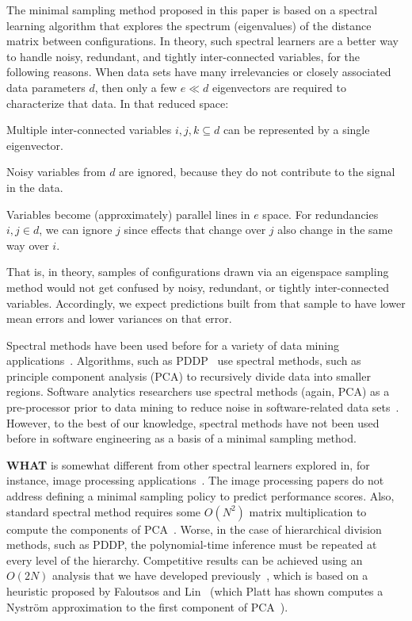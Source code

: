 \documentclass{sig-alternative}
\newcommand{\what}{{\bf WHAT }}
\begin{document}
The minimal sampling method proposed in this paper is based on a spectral learning algorithm
that  explores the spectrum (eigenvalues) of the distance matrix between  configurations.
In theory, such spectral learners are a better way to handle noisy, redundant, and tightly inter-connected variables, for the following reasons.
When data sets have many irrelevancies or closely associated data parameters $d$, then
only a few $e \ll d$ eigenvectors are required to characterize that data.
In that reduced space:
\begin{compactitem}
\item
Multiple inter-connected variables $i,j,k \subseteq d$ can be represented
by a single eigenvector.
\item
Noisy variables from $d$ are
ignored, because they  do not contribute to the signal in the data.
\item
Variables  become (approximately) parallel lines
in $e$ space. For  redundancies \mbox{$i,j \in d$}, we
can ignore $j$
since effects that change over $j$ also
change in the same way over $i$.
\end{compactitem}
That is, in theory, samples of configurations drawn via an eigenspace sampling method
would not get confused by noisy, redundant, or tightly inter-connected variables. Accordingly,
we expect predictions built from that sample to have  lower mean errors and lower variances on that error.

Spectral methods have been used before for a variety of data mining applications~\cite{kamvar2003spectral}.
Algorithms, such as PDDP~\cite{boley98} use spectral methods, such as principle component analysis (PCA) to
recursively divide data into smaller regions.  Software analytics researchers use spectral methods (again, PCA) as a pre-processor prior to data mining  to reduce noise in software-related data sets~\cite{Theisen15}.
However, to the best of our knowledge, spectral methods have not been used before in software engineering as a basis of a minimal sampling method.


\what is somewhat different from other spectral
learners explored in, for instance, image processing applications~\cite{shi00}.
The image processing papers do not address
defining a minimal sampling policy to predict performance scores.
Also, standard spectral method requires some $O(N^2)$ matrix multiplication to compute the components
of PCA~\cite{ilin10}. Worse, in the case of hierarchical division methods, such as PDDP,
the polynomial-time inference must be repeated at every level of the hierarchy.
Competitive results can be achieved
using an $O(2N)$ analysis that we have developed previously~\cite{me12d}, which is  based on  a heuristic proposed by Faloutsos and Lin~\cite{Faloutsos1995} (which Platt has shown computes a Nystr\"om approximation to the first component of PCA~\cite{platt05}).
  
\end{document}
